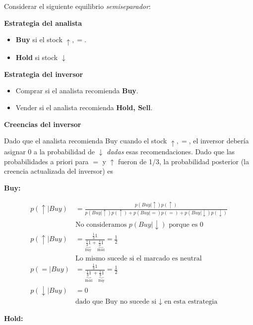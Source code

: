 \documentclass[12pt]{article}
\begin{document}
Considerar el siguiente equilibrio \textit{semiseparador}:

\textbf{Estrategia del analista}

\begin{itemize}
\setlength{\itemsep}{0pt}
\setlength{\parskip}{0pt}
\setlength{\parsep}{0pt}
	\item \textbf{Buy} si el stock $ \uparrow , = $.
	\item \textbf{Hold} si stock $ \downarrow $
\end{itemize} 

\textbf{Estrategia del inversor}

\begin{itemize}
	\setlength{\itemsep}{0pt}
	\setlength{\parskip}{0pt}
	\setlength{\parsep}{0pt}
	\item Comprar si el analista recomienda \textbf{Buy}.
	\item Vender si el analista recomienda \textbf{Hold, Sell}.
\end{itemize}

\textbf{Creencias del inversor}

Dado que el analista recomienda Buy cuando el stock $ \uparrow, = $, el inversor debería asignar 0 a la probabilidad de $ \downarrow  $ \textit{dadas} esas recomendaciones. Dado que las probabilidades a priori para $ = $ y $ \uparrow  $ fueron de 1/3, la probabilidad posterior (la creencia actualizada del inversor) es 

\textbf{Buy:}

\begin{align*}
	p(\uparrow | Buy) &= \frac{p(Buy | \uparrow)p(\uparrow)}{p(Buy | \uparrow)p(\uparrow) + p(Buy | =)p(=) + p(Buy | \downarrow)p(\downarrow)}\\
	&\text{No consideramos } p(Buy | \downarrow) \text{ porque es }0\\
	p(\uparrow | Buy) &= \frac{\frac{1}{3}1}{\underbrace{\frac{1}{3}1}_{\text{Buy}}+\underbrace{\frac{1}{3}1}_{\text{Hold}}} = \frac{1}{2}\\ 
	&\text{Lo mismo sucede si el marcado es neutral}\\
	p(=| Buy) &= \frac{\frac{1}{3}1}{\underbrace{\frac{1}{3}1}_{\text{Hold}}+\underbrace{\frac{1}{3}1}_{\text{Buy}}} = \frac{1}{2}\\ 
	p(\downarrow | Buy) &= 0 \\ 
	&\text{dado que Buy no sucede si } \downarrow \text{ en esta estrategia}
\end{align*}

\textbf{Hold:}
\end{document}
